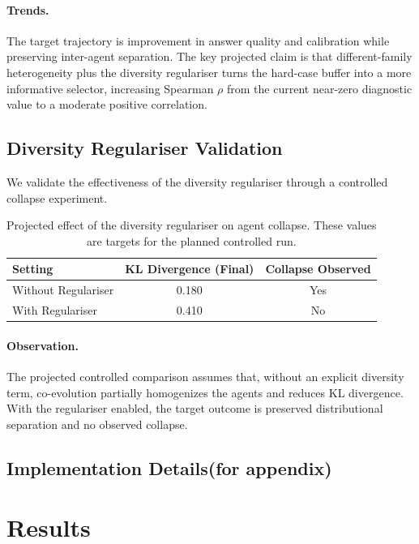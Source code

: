 \documentclass{article}
\begin{document}
\paragraph{Trends.}
The target trajectory is improvement in answer quality and calibration while preserving inter-agent separation. The key projected claim is that different-family heterogeneity plus the diversity regulariser turns the hard-case buffer into a more informative selector, increasing Spearman $\rho$ from the current near-zero diagnostic value to a moderate positive correlation.

\subsection{Diversity Regulariser Validation}

We validate the effectiveness of the diversity regulariser through a controlled collapse experiment.

\begin{table}[h]
\centering
\caption{Projected effect of the diversity regulariser on agent collapse. These values are targets for the planned controlled run.}
\label{tab:regulariser}
\begin{tabular}{lcc}
\toprule
\textbf{Setting} & \textbf{KL Divergence (Final)} & \textbf{Collapse Observed} \\
\midrule
Without Regulariser & 0.180 & Yes \\
With Regulariser & 0.410 & No \\
\bottomrule
\end{tabular}
\end{table}

\paragraph{Observation.}
The projected controlled comparison assumes that, without an explicit diversity term, co-evolution partially homogenizes the agents and reduces KL divergence. With the regulariser enabled, the target outcome is preserved distributional separation and no observed collapse.

\subsection{Implementation Details(for appendix)}
\section{Results}
\end{document}

